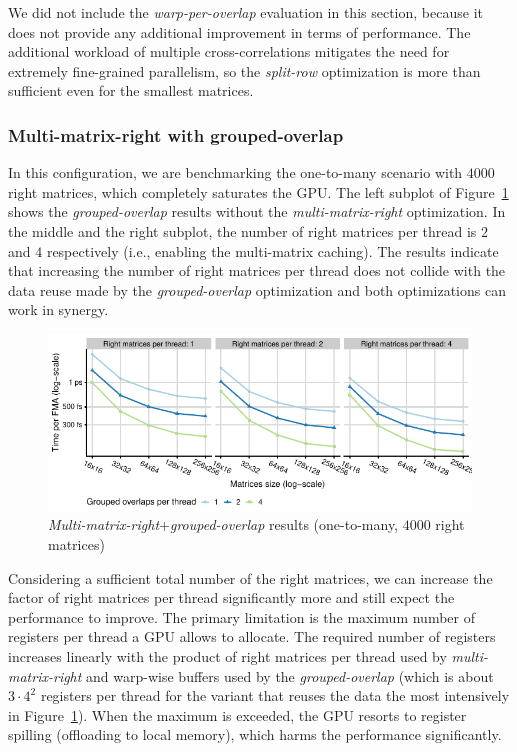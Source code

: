We did not include the \emph{warp-per-overlap} evaluation in this section, because it does not provide any additional improvement in terms of performance. The additional workload of multiple cross-correlations mitigates the need for extremely fine-grained parallelism, so the \emph{split-row} optimization is more than sufficient even for the smallest matrices.

\subsubsection{Multi-matrix-right with grouped-overlap}

In this configuration, we are benchmarking the one-to-many scenario with $4000$ right matrices, which completely saturates the GPU. The left subplot of Figure~\ref{fig:multimat-right-grouped-overlap} shows the \emph{grouped-overlap} results without the \emph{multi-matrix-right} optimization. In the middle and the right subplot, the number of right matrices per thread is $2$ and $4$ respectively (i.e., enabling the multi-matrix caching). The results indicate that increasing the number of right matrices per thread does not collide with the data reuse made by the \emph{grouped-overlap} optimization and both optimizations can work in synergy.

\begin{figure}[ht]
	\centering
	\includegraphics{crosscorr/plots/one-to-many/multimat-right-grouped-overlap.pdf}
	\caption{\emph{Multi-matrix-right}+\emph{grouped-overlap} results (one-to-many, $4000$ right matrices)}
	\label{fig:multimat-right-grouped-overlap}
\end{figure}

Considering a sufficient total number of the right matrices, we can increase the factor of right matrices per thread significantly more and still expect the performance to improve. The primary limitation is the maximum number of registers per thread a GPU allows to allocate. The required number of registers increases linearly with the product of right matrices per thread used by \emph{multi-matrix-right} and warp-wise buffers used by the \emph{grouped-overlap} (which is about $3 \cdot 4^2$ registers per thread for the variant that reuses the data the most intensively in Figure~\ref{fig:multimat-right-grouped-overlap}). When the maximum is exceeded, the GPU resorts to register spilling (offloading to local memory), which harms the performance significantly.

